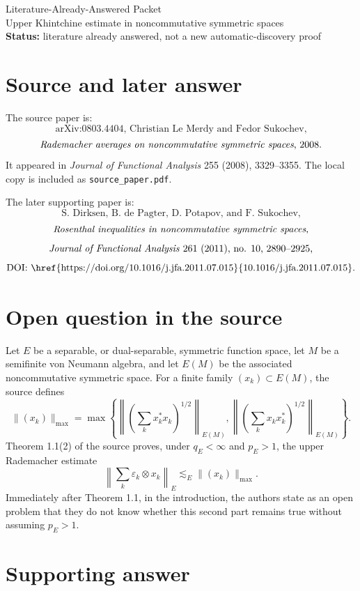 \documentclass[11pt]{article}
\begin{document}
\begin{center}
{\Large Literature-Already-Answered Packet}\\[0.25em]
{\large Upper Khintchine estimate in noncommutative symmetric spaces}\\[0.35em]
\textbf{Status:} literature already answered, not a new automatic-discovery proof
\end{center}

\section*{Source and later answer}

The source paper is:
\[
\text{arXiv:0803.4404, Christian Le Merdy and Fedor Sukochev,}
\]
\[
\text{\emph{Rademacher averages on noncommutative symmetric spaces}, 2008.}
\]
It appeared in \emph{Journal of Functional Analysis} 255 (2008),
3329--3355. The local copy is included as \texttt{source\_paper.pdf}.

The later supporting paper is:
\[
\text{S. Dirksen, B. de Pagter, D. Potapov, and F. Sukochev,}
\]
\[
\text{\emph{Rosenthal inequalities in noncommutative symmetric spaces},}
\]
\[
\text{\emph{Journal of Functional Analysis} 261 (2011), no. 10, 2890--2925,}
\]
\[
\text{DOI: \href{https://doi.org/10.1016/j.jfa.2011.07.015}{10.1016/j.jfa.2011.07.015}.}
\]

\section*{Open question in the source}

Let \(E\) be a separable, or dual-separable, symmetric function space, let
\(M\) be a semifinite von Neumann algebra, and let \(E(M)\) be the associated
noncommutative symmetric space. For a finite family \((x_k)\subset E(M)\), the
source defines
\[
\|(x_k)\|_{\max}
= \max\left\{
\left\|\left(\sum_k x_k^*x_k\right)^{1/2}\right\|_{E(M)},
\left\|\left(\sum_k x_kx_k^*\right)^{1/2}\right\|_{E(M)}
\right\}.
\]
Theorem 1.1(2) of the source proves, under \(q_E<\infty\) and \(p_E>1\), the
upper Rademacher estimate
\[
\left\|\sum_k \varepsilon_k\otimes x_k\right\|_E
\lesssim_E \|(x_k)\|_{\max}.
\tag{1}
\]
Immediately after Theorem 1.1, in the introduction, the authors state as an
open problem that they do not know whether this second part remains true
without assuming \(p_E>1\).

\section*{Supporting answer}
\end{document}
